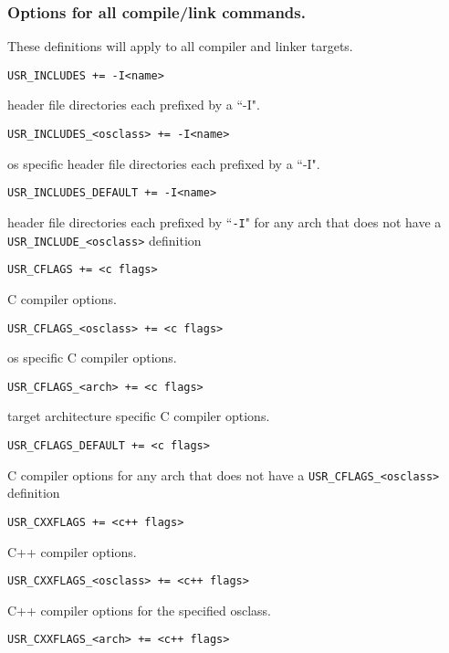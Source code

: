 \subsubsection{Options for all compile/link commands.}

These definitions will apply to all compiler and linker targets.

\begin{description}

\item {}\verb|USR_INCLUDES += -I<name>|

header file directories each prefixed by a ``-I".

\item \verb|USR_INCLUDES_<osclass> += -I<name>|

os specific header file directories each prefixed by a ``-I".

\item \verb|USR_INCLUDES_DEFAULT += -I<name>|

header file directories each prefixed by ``\verb|-I|" for any arch that does not have a \verb|USR_INCLUDE_<osclass>| definition

\item {}\verb|USR_CFLAGS += <c flags>|

C compiler options.

\item \verb|USR_CFLAGS_<osclass> += <c flags>|

os specific C compiler options.

\item \verb|USR_CFLAGS_<arch> += <c flags>|

target architecture specific C compiler options.

\item \verb|USR_CFLAGS_DEFAULT += <c flags>|

C compiler options for any arch that does not have a \verb|USR_CFLAGS_<osclass>| definition

\item {}\verb|USR_CXXFLAGS += <c++ flags>|

C++ compiler options.

\item \verb|USR_CXXFLAGS_<osclass> += <c++ flags>|

C++ compiler options for the specified osclass.

\item \verb|USR_CXXFLAGS_<arch> += <c++ flags>|


\end{description}
